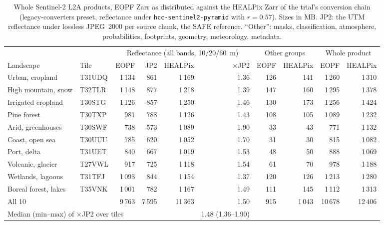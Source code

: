 \begin{table}[t]
\centering
\caption{Whole Sentinel-2 L2A products, EOPF Zarr as distributed against the HEALPix Zarr of the trial's conversion chain (legacy-converters preset, reflectance under \texttt{hcc-sentinel2-pyramid} with $r=0.57$). Sizes in MB. JP2: the UTM reflectance under lossless JPEG~2000 per source chunk, the SAFE reference. ``Other'': masks, classification, atmosphere, probabilities, footprints, geometry, meteorology, metadata.}
\label{tab:operational_sizes}
\small
\begin{tabular}{llrrrrrrrr}
\toprule
 & & \multicolumn{4}{c}{Reflectance (all bands, 10/20/60~m)} & \multicolumn{2}{c}{Other groups} & \multicolumn{2}{c}{Whole product} \\
\cmidrule(lr){3-6}\cmidrule(lr){7-8}\cmidrule(lr){9-10}
Landscape & Tile & EOPF & JP2 & HEALPix & $\times$JP2 & EOPF & HEALPix & EOPF & HEALPix \\
\midrule
Urban, cropland & T31UDQ & 1\,134 & 861 & 1\,169 & 1.36 & 126 & 141 & 1\,260 & 1\,310 \\
High mountain, snow & T32TLR & 1\,148 & 877 & 1\,218 & 1.39 & 147 & 160 & 1\,295 & 1\,378 \\
Irrigated cropland & T30STG & 1\,126 & 857 & 1\,250 & 1.46 & 130 & 173 & 1\,256 & 1\,424 \\
Pine forest & T30TXP & 981 & 788 & 1\,126 & 1.43 & 108 & 105 & 1\,089 & 1\,232 \\
Arid, greenhouses & T30SWF & 738 & 573 & 1\,089 & 1.90 & 33 & 43 & 771 & 1\,132 \\
Coast, open sea & T30UUU & 785 & 620 & 1\,052 & 1.70 & 31 & 30 & 815 & 1\,082 \\
Port, delta & T31UET & 840 & 667 & 1\,019 & 1.53 & 48 & 50 & 888 & 1\,069 \\
Volcanic, glacier & T27VWL & 917 & 725 & 1\,118 & 1.54 & 61 & 70 & 978 & 1\,188 \\
Wetlands, lagoons & T31TFJ & 1\,093 & 844 & 1\,154 & 1.37 & 120 & 126 & 1\,213 & 1\,280 \\
Boreal forest, lakes & T35VNK & 1\,001 & 782 & 1\,167 & 1.49 & 111 & 145 & 1\,112 & 1\,313 \\
\midrule
All 10 & & 9\,763 & 7\,595 & 11\,363 & 1.50 & 915 & 1\,043 & 10\,678 & 12\,406 \\
\multicolumn{5}{l}{Median (min--max) of $\times$JP2 over tiles} & 1.48 (1.36--1.90) & & & & \\
\bottomrule
\end{tabular}
\end{table}
